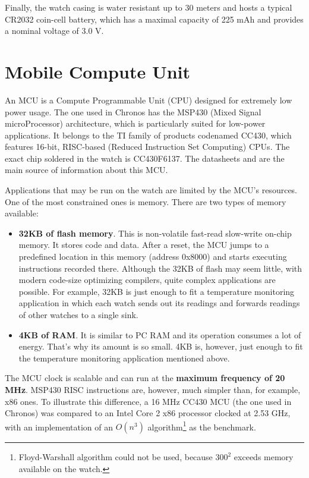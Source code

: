 Finally, the watch casing is water resistant up to 30 meters and hosts
a typical CR2032 coin-cell battery, which has a maximal capacity of
225 mAh and provides a nominal voltage of 3.0 V.

\section{Mobile Compute Unit}

An MCU is a Compute Programmable Unit (CPU) designed for extremely
low power usage. The one used in Chronos has the MSP430 (Mixed Signal
microProcessor) architecture, which is particularly suited for
low-power applications. It belongs to the TI family of products
codenamed CC430, which features 16-bit, RISC-based (Reduced Instruction
Set Computing) CPUs. The exact chip soldered in the watch is CC430F6137. The
datasheets \cite{CC430ds} and \cite{CC430F6137ds} are the main source of
information about this MCU.

Applications that may be run on the watch are limited by the MCU's
resources. One of the most constrained ones is memory. There are two types
of memory available:
\begin{itemize}
  \item {\bf 32KB of flash memory}. This is non-volatile fast-read
    slow-write on-chip memory. It stores code and data. After a reset,
    the MCU jumps to a predefined location in this memory (address
    0x8000) and starts executing instructions recorded there. Although
    the 32KB of flash may seem little, with modern code-size
    optimizing compilers, quite complex applications are possible. For
    example, 32KB is just enough to fit a temperature monitoring
    application in which each watch sends out its readings and forwards
    readings of other watches to a single sink.
  \item {\bf 4KB of RAM}. It is similar to PC RAM and its
    operation consumes a lot of energy. That's why its amount is so
    small. 4KB is, however, just enough to fit the temperature monitoring
    application mentioned above.
\end{itemize}

The MCU clock is scalable and can run at the {\bf maximum frequency of
20 MHz}.  MSP430 RISC instructions are, however, much simpler than,
for example, x86 ones. To illustrate this difference, a 16 MHz CC430
MCU (the one used in Chronos) was compared to an Intel Core 2 x86
processor clocked at 2.53 GHz, with an implementation of an $O(n^3)$
algorithm\footnote{Floyd-Warshall algorithm could not be used, because $300^2$
exceeds memory available on the watch.} as the benchmark.


